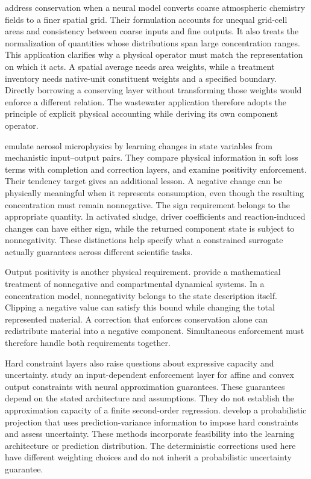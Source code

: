 \citet{Geiss2022} address conservation when a neural model converts coarse atmospheric chemistry fields to a finer spatial grid. Their formulation accounts for unequal grid-cell areas and consistency between coarse inputs and fine outputs. It also treats the normalization of quantities whose distributions span large concentration ranges. This application clarifies why a physical operator must match the representation on which it acts. A spatial average needs area weights, while a treatment inventory needs native-unit constituent weights and a specified boundary. Directly borrowing a conserving layer without transforming those weights would enforce a different relation. The wastewater application therefore adopts the principle of explicit physical accounting while deriving its own component operator.

\citet{Harder2022} emulate aerosol microphysics by learning changes in state variables from mechanistic input--output pairs. They compare physical information in soft loss terms with completion and correction layers, and examine positivity enforcement. Their tendency target gives an additional lesson. A negative change can be physically meaningful when it represents consumption, even though the resulting concentration must remain nonnegative. The sign requirement belongs to the appropriate quantity. In activated sludge, driver coefficients and reaction-induced changes can have either sign, while the returned component state is subject to nonnegativity. These distinctions help specify what a constrained surrogate actually guarantees across different scientific tasks.

Output positivity is another physical requirement. \citet{Haddad2010} provide a mathematical treatment of nonnegative and compartmental dynamical systems. In a concentration model, nonnegativity belongs to the state description itself. Clipping a negative value can satisfy this bound while changing the total represented material. A correction that enforces conservation alone can redistribute material into a negative component. Simultaneous enforcement must therefore handle both requirements together.

Hard constraint layers also raise questions about expressive capacity and uncertainty. \citet{Min2024} study an input-dependent enforcement layer for affine and convex output constraints with neural approximation guarantees. These guarantees depend on the stated architecture and assumptions. They do not establish the approximation capacity of a finite second-order regression. \citet{Utkarsh2025} develop a probabilistic projection that uses prediction-variance information to impose hard constraints and assess uncertainty. These methods incorporate feasibility into the learning architecture or prediction distribution. The deterministic corrections used here have different weighting choices and do not inherit a probabilistic uncertainty guarantee.


